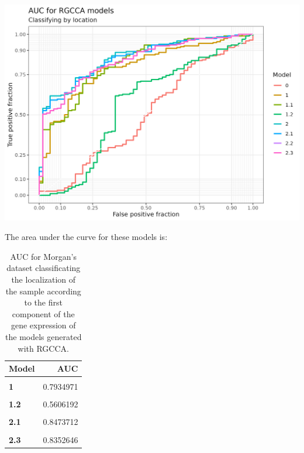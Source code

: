 \documentclass[
  a4paper,
]{book}
\let\origfigure\figure
\let\endorigfigure\endfigure
\renewenvironment{figure}[1][2] {
    \expandafter\origfigure\expandafter[!ht]
} {
    \endorigfigure
}
\begin{document}
\begin{figure}
\includegraphics[width=1\linewidth]{images/morgan-auc} \caption[AUC plot for Morgan's dataset]{AUC for Morgan's dataset classificating the localization of the sample according to the first component of the gene expression of the models generated with RGCCA.}\label{fig:morgan-auc-plot}
\end{figure}

The area under the curve for these models is:

\begin{table}[H]

\caption[AUC for Morgan's dataset]{\label{tab:morgan-auc}AUC for Morgan's dataset classificating the localization of the sample according to the first component of the gene expression of the models generated with RGCCA.}
\centering
\begin{tabular}[t]{|>{}l|>{}r|}
\hline
\textbf{Model} & \textbf{AUC}\\
\hline
\textbf{\cellcolor{gray!6}{0}} & \cellcolor{gray!6}{0.4969734}\\
\hline
\textbf{1} & 0.7934971\\
\hline
\textbf{\cellcolor{gray!6}{1.1}} & \cellcolor{gray!6}{0.8161536}\\
\hline
\textbf{1.2} & 0.5606192\\
\hline
\textbf{\cellcolor{gray!6}{2}} & \cellcolor{gray!6}{0.8546351}\\
\hline
\textbf{2.1} & 0.8473712\\
\hline
\textbf{\cellcolor{gray!6}{2.2}} & \cellcolor{gray!6}{0.8352646}\\
\hline
\textbf{2.3} & 0.8352646\\
\hline
\end{tabular}
\end{table}
\end{document}
